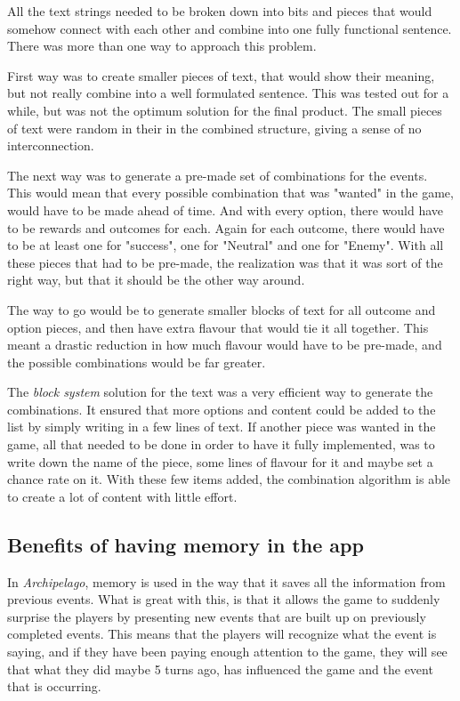 All the text strings needed to be broken down into bits and pieces that would somehow connect with each other and combine into one fully functional sentence. 
There was more than one way to approach this problem.

First way was to create smaller pieces of text, that would show their meaning, but not really combine into a well formulated sentence. This was tested out for a while, but was not the optimum solution for the final product.
The small pieces of text were random in their in the combined structure, giving a sense of no interconnection.

The next way was to generate a pre-made set of combinations for the events. This would mean that every possible combination that was "wanted" in the game, would have to be made ahead of time. And with every option, there would have to be rewards and outcomes for each. Again for each outcome, there would have to be at least one for "success", one for "Neutral" and one for "Enemy". 
With all these pieces that had to be pre-made, the realization was that it was sort of the right way, but that it should be the other way around. 

The way to go would be to generate smaller blocks of text for all outcome and option pieces, and then have extra flavour that would tie it all together. This meant a drastic reduction in how much flavour would have to be pre-made, and the possible combinations would be far greater. 

The \textit{block system} solution for the text was a very efficient way to generate the combinations. It ensured that more options and content could be added to the list by simply writing in a few lines of text. If another piece was wanted in the game, all that needed to be done in order to have it fully implemented, was to write down the name of the piece, some lines of flavour for it and maybe set a chance rate on it. With these few items added, the combination algorithm is able to create a lot of content with little effort.

\subsection{Benefits of having memory in the app}
In \textit{Archipelago}, memory is used in the way that it saves all the information from previous events.
What is great with this, is that it allows the game to suddenly surprise the players by presenting new events that are built up on previously completed events. This means that the players will recognize what the event is saying, and if they have been paying enough attention to the game, they will see that what they did maybe 5 turns ago, has influenced the game and the event that is occurring. 

